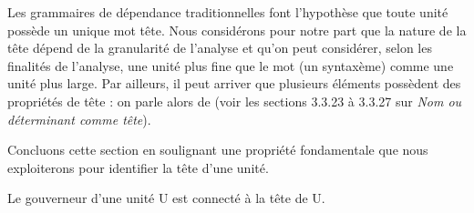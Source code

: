 Les grammaires de dépendance traditionnelles font l’hypothèse que toute unité possède un unique mot tête. Nous considérons pour notre part que la nature de la tête dépend de la granularité de l’analyse et qu’on peut considérer, selon les finalités de l’analyse, une unité plus fine que le mot (un syntaxème) comme une unité plus large. Par ailleurs, il peut arriver que plusieurs éléments possèdent des propriétés de tête : on parle alors de  (voir les sections 3.3.23 à 3.3.27 sur \textit{Nom ou déterminant comme tête}).

Concluons cette section en soulignant une propriété fondamentale que nous exploiterons pour identifier la tête d’une unité.

\begin{tblsframed}{}
\noindent Le gouverneur d’une unité U est connecté à la tête de U.
\end{tblsframed}


